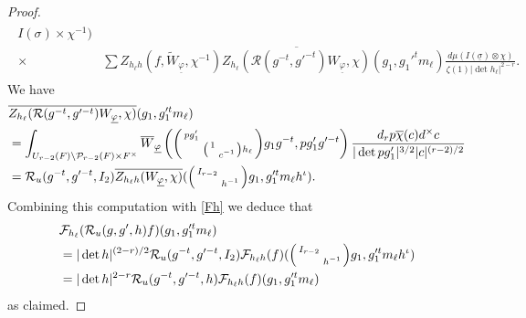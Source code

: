 \documentclass[12pt]{amsart}
\theoremstyle{remark}
\numberwithin{equation}{section}
\theoremstyle{definition}
\newenvironment{psmatrix}
  {\left(\begin{smallmatrix}}
  {\end{smallmatrix}\right)}
\numberwithin{equation}{subsection}
\begin{document}
\begin{proof}
\begin{align}
\begin{split}
   I(\sigma)\times\chi^{-1})\\ \times & 
    \sum
    Z_{h_\ell h}(f,\widetilde{W}_{\underline{\varphi}},\chi^{-1})\overline{Z_{h_\ell}(\mathcal{R}(g^{-t},g'^{-t})W_{\underline{\varphi}},\chi)}(g_1,g_1'^tm_{\ell})\frac{d\mu(I(\underline{\sigma}) \otimes \chi)}{\zeta(1)|\det h_\ell|^{2-r}}.
    \end{split}
\end{align}
We have
\begin{align*}
   & \overline{Z_{h_\ell}(\mathcal{R}(g^{-t},g'^{-t})W_{\underline{\varphi}},\chi)}(g_1,g_1'^tm_{\ell})\\
    &=\int_{U_{r-2}(F) \backslash \mathcal{P}_{r-2}(F) \times F^\times}\overline{W}_{\underline{\varphi}}\left(\begin{psmatrix}pg'_1 & \\ &  \begin{psmatrix} 1 & \\ & c^{-1} \end{psmatrix}h_\ell\end{psmatrix}g_1g^{-t},pg'_1g'^{-t}  \right)\frac{d_r p\overline{\chi}(c)d^\times c}{|\det pg_1'|^{3/2}|c|^{(r-2)/2}}\\
    &=\mathcal{R}_u(g^{-t},g'^{-t},I_{2})\overline{Z_{h_\ell h}(W_{\underline{\varphi}},\chi)}(\begin{psmatrix}
        I_{r-2} & \\
        & h^{-1}
    \end{psmatrix}g_1,g_1'^tm_{\ell} h^\iota).
\end{align*}
 Combining this computation with \eqref{Fh} we deduce that 
\begin{align*}
    &\mathcal{F}_{h_\ell}(\mathcal{R}_u(g,g',h)f)(g_1,g_1'^tm_{\ell})\\
    &=|\det h|^{(2-r)/2}\mathcal{R}_u(g^{-t},g'^{-t},I_2)\mathcal{F}_{h_{\ell}h}(f)(\begin{psmatrix}
        I_{r-2}&\\
            &h^{-1}
    \end{psmatrix}g_1,g_1'^tm_{\ell}h^\iota)\\
    &=|\det h|^{2-r}\mathcal{R}_u(g^{-t},g'^{-t},h)\mathcal{F}_{h_{\ell}h}(f)(g_1,g_1'^tm_{\ell})
\end{align*}
as claimed.
\end{proof}
\end{document}
